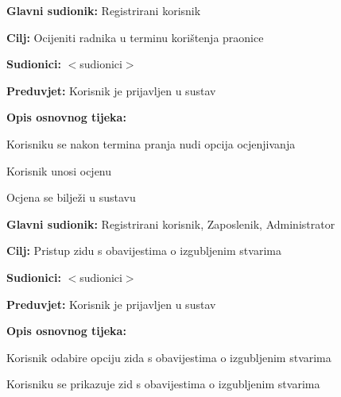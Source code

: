 \noindent {}
\begin{packed_item}
	
	\item \textbf{Glavni sudionik: }Registrirani korisnik
	\item  \textbf{Cilj:} Ocijeniti radnika u terminu korištenja praonice
	\item  \textbf{Sudionici:} $<$sudionici$>$
	\item  \textbf{Preduvjet:} Korisnik je prijavljen u sustav
	\item  \textbf{Opis osnovnog tijeka:}
	
	\item[] \begin{packed_enum}
		
		\item Korisniku se nakon termina pranja nudi opcija ocjenjivanja
		\item Korisnik unosi ocjenu
		\item Ocjena se bilježi u sustavu
	\end{packed_enum}
		
\end{packed_item}

\noindent {}
\begin{packed_item}
	
	\item \textbf{Glavni sudionik: } Registrirani korisnik, Zaposlenik, Administrator 
	\item  \textbf{Cilj:} Pristup zidu s obavijestima o izgubljenim stvarima
	\item  \textbf{Sudionici:} $<$sudionici$>$
	\item  \textbf{Preduvjet:} Korisnik je prijavljen u sustav
	\item  \textbf{Opis osnovnog tijeka:}
	
	\item[] \begin{packed_enum}
		
		\item Korisnik odabire opciju zida s obavijestima o izgubljenim stvarima
		\item Korisniku se prikazuje zid s obavijestima o izgubljenim stvarima
	\end{packed_enum}
\end{packed_item}


